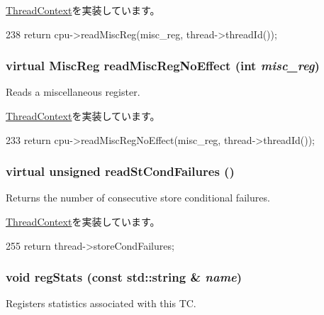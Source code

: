 \hyperlink{classThreadContext_a6888f4bff21e34892e59654ea80073b2}{ThreadContext}を実装しています。


\begin{DoxyCode}
238     { return cpu->readMiscReg(misc_reg, thread->threadId()); }
\end{DoxyCode}
\hypertarget{classO3ThreadContext_af74f978ea46123cf036c750e52d98438}{
\subsubsection[{readMiscRegNoEffect}]{\setlength{\rightskip}{0pt plus 5cm}virtual {\bf MiscReg} readMiscRegNoEffect (int {\em misc\_\-reg})}}
\label{classO3ThreadContext_af74f978ea46123cf036c750e52d98438}
Reads a miscellaneous register. 

\hyperlink{classThreadContext_a93c9c97261cb7289d5976b8222f70c4c}{ThreadContext}を実装しています。


\begin{DoxyCode}
233     { return cpu->readMiscRegNoEffect(misc_reg, thread->threadId()); }
\end{DoxyCode}
\hypertarget{classO3ThreadContext_a8cbbb8eea07477baa78336be358c632b}{
\subsubsection[{readStCondFailures}]{\setlength{\rightskip}{0pt plus 5cm}virtual unsigned readStCondFailures ()}}
\label{classO3ThreadContext_a8cbbb8eea07477baa78336be358c632b}
Returns the number of consecutive store conditional failures. 

\hyperlink{classThreadContext_ab1bc64ec54c1cc47c9945fe68fa9e91c}{ThreadContext}を実装しています。


\begin{DoxyCode}
255     { return thread->storeCondFailures; }
\end{DoxyCode}
\hypertarget{classO3ThreadContext_a3dd3443357312bcb75580eaa508c48a4}{
\subsubsection[{regStats}]{\setlength{\rightskip}{0pt plus 5cm}void regStats (const std::string \& {\em name})}}
\label{classO3ThreadContext_a3dd3443357312bcb75580eaa508c48a4}
Registers statistics associated with this TC. 

